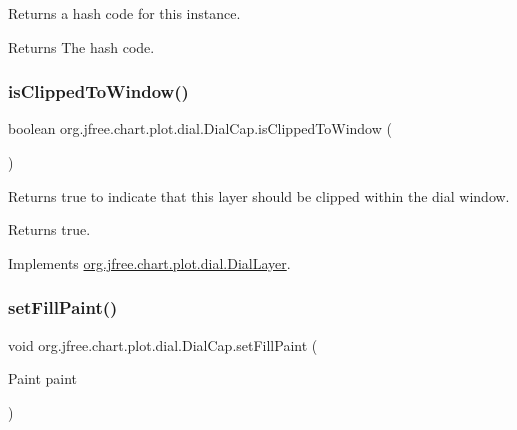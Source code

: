 Returns a hash code for this instance.

\begin{DoxyReturn}{Returns}
The hash code. 
\end{DoxyReturn}
\mbox{\label{classorg_1_1jfree_1_1chart_1_1plot_1_1dial_1_1_dial_cap_a46ceaed99922a02c843f115a3691d467}} 
\subsubsection{\texorpdfstring{is\+Clipped\+To\+Window()}{isClippedToWindow()}}
{\footnotesize\ttfamily boolean org.\+jfree.\+chart.\+plot.\+dial.\+Dial\+Cap.\+is\+Clipped\+To\+Window (\begin{DoxyParamCaption}{ }\end{DoxyParamCaption})}

Returns {\ttfamily true} to indicate that this layer should be clipped within the dial window.

\begin{DoxyReturn}{Returns}
{\ttfamily true}. 
\end{DoxyReturn}


Implements \mbox{\hyperlink{interfaceorg_1_1jfree_1_1chart_1_1plot_1_1dial_1_1_dial_layer_a822eeadbe31b48827497714abeda2190}{org.\+jfree.\+chart.\+plot.\+dial.\+Dial\+Layer}}.

\mbox{\label{classorg_1_1jfree_1_1chart_1_1plot_1_1dial_1_1_dial_cap_a2fc72d3eee10eda463f89cf4590ebe01}} 
\subsubsection{\texorpdfstring{set\+Fill\+Paint()}{setFillPaint()}}
{\footnotesize\ttfamily void org.\+jfree.\+chart.\+plot.\+dial.\+Dial\+Cap.\+set\+Fill\+Paint (\begin{DoxyParamCaption}\item[{Paint}]{paint }\end{DoxyParamCaption})}


